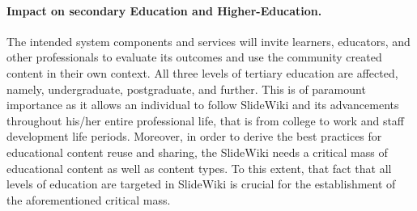 \documentclass[ngerman,UKenglish,table]{scrbook}
\makeatletter
\newcommand{\todo}[1]{\textcolor{red}{@TODO: #1}}
\makeatother
\begin{document}
%  
%
%
%




\paragraph{Impact on secondary Education and Higher-Education.}
The intended system components and services will invite learners, educators, and other professionals to evaluate its outcomes and use the community created content in their own context.
All three levels of tertiary education are affected, namely, undergraduate, postgraduate, and further.
This is of paramount importance as it allows an individual to follow SlideWiki and its advancements throughout his/her entire professional life, that is from college to work and staff development life periods.
Moreover, in order to derive the best practices for educational content reuse and sharing, the SlideWiki needs a critical mass of educational content as well as content types.
To this extent, that fact that all levels of education are targeted in SlideWiki is crucial for the establishment of the aforementioned critical mass.
			
\end{document}
